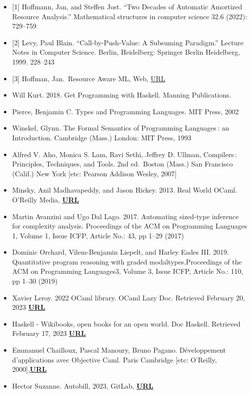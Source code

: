 \documentclass[
  12pt,
]{article}
\begin{document}
\begin{itemize}
\item
  {[}1{]} Hoffmann, Jan, and Steffen Jost. ``Two Decades of Automatic
  Amortized Resource Analysis.'' Mathematical structures in computer
  science 32.6 (2022): 729--759
\item
  {[}2{]} Levy, Paul Blain. ``Call-by-Push-Value: A Subsuming
  Paradigm.'' Lecture Notes in Computer Science. Berlin, Heidelberg:
  Springer Berlin Heidelberg, 1999. 228--243
\item
  {[}3{]} Hoffman, Jan.~Resource Aware ML, Web,
  \href{https://www.raml.co/}{URL}
\item
  Will Kurt. 2018. Get Programming with Haskell. Manning Publications.
\item
  Pierce, Benjamin C. Types and Programming Languages. MIT Press, 2002
\item
  Winskel, Glynn. The Formal Semantics of Programming Languages\,: an
  Introduction. Cambridge (Mass.) London: MIT Press, 1993
\item
  Alfred V. Aho, Monica S. Lam, Ravi Sethi, Jeffrey D. Ullman,
  Compilers\,: Principles, Techniques, and Tools. 2nd ed.~Boston (Mass.)
  San Francisco (Calif.) New York {[}etc: Pearson Addison Wesley,
  2007{]}
\item
  Minsky, Anil Madhavapeddy, and Jason Hickey. 2013. Real World OCaml.
  O'Reilly Media, \href{https://dev.realworldocaml.org/}{\textbf{URL}}
\item
  Martin Avanzini and Ugo Dal Lago. 2017. Automating sized-type
  inference for complexity analysis. Proceedings of the ACM on
  Programming Languages 1, Volume 1, Issue ICFP, Article No.: 43, pp
  1--29 (2017)
\item
  Dominic Orchard, Vilem-Benjamin Liepelt, and Harley Eades III. 2019.
  Quantitative program reasoning with graded modaltypes.Proceedings of
  the ACM on Programming Languages3, Volume 3, Issue ICFP, Article No.:
  110, pp 1--30 (2019)
\item
  Xavier Leroy. 2022 OCaml library. OCaml Lazy Doc. Retrieved February
  20, 2023 \href{https://v2.OCaml.org/api/index.html}{\textbf{URL}}
\item
  Haskell - Wikibooks, open books for an open world. Doc Haskell.
  Retrieved February 17, 2023
  \href{https://en.wikibooks.org/wiki/Haskell}{\textbf{URL}}
\item
  Emmanuel Chailloux, Pascal Manoury, Bruno Pagano. Développement
  d'applications avec Objective Caml. Paris Cambridge {[}etc: O'Reilly,
  2000{]},\href{https://www-apr.lip6.fr/~chaillou/Public/DA-OCAML/}{\textbf{URL}}
\item
  Hector Suzanne. Autobill, 2023, GitLab,
  \href{https://gitlab.lip6.fr/suzanneh/autobill}{\textbf{URL}}
\end{itemize}
\end{document}
